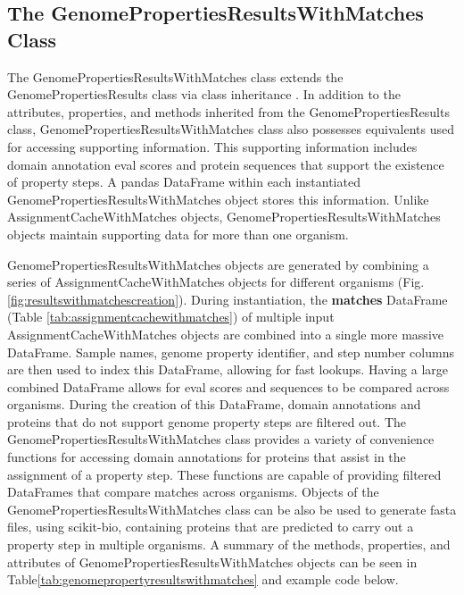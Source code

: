 \pagebreak

\subsection{The GenomePropertiesResultsWithMatches Class} 
\label{PropertyResultsWithMatches}

The GenomePropertiesResultsWithMatches class extends the GenomePropertiesResults 
class via class inheritance \cite{snyder1986encapsulation}. In addition to the 
attributes, properties, and methods inherited from the GenomePropertiesResults 
class, GenomePropertiesResultsWithMatches class also possesses equivalents used 
for accessing supporting information. This supporting information includes 
domain annotation \gls{eval} scores and protein sequences that support the 
existence of property steps. A pandas DataFrame within each instantiated 
GenomePropertiesResultsWithMatches object stores this information. Unlike 
AssignmentCacheWithMatches objects, GenomePropertiesResultsWithMatches objects 
maintain supporting data for more than one organism.

GenomePropertiesResultsWithMatches objects are generated by combining a series 
of AssignmentCacheWithMatches objects for different organisms (Fig. 
\ref{fig:resultswithmatchescreation}). During instantiation, the 
\textbf{matches} DataFrame (Table \ref{tab:assignmentcachewithmatches}) of 
multiple input AssignmentCacheWithMatches objects are combined into a single 
more massive DataFrame. Sample names, genome property identifier, and step 
number columns are then used to index this DataFrame, allowing for fast lookups. 
Having a large combined DataFrame allows for \gls{eval} scores and sequences to 
be compared across organisms. During the creation of this DataFrame, domain 
annotations and proteins that do not support genome property steps are filtered 
out. The GenomePropertiesResultsWithMatches class provides a variety of 
convenience functions for accessing domain annotations for proteins that assist 
in the assignment of a property step. These functions are capable of providing 
filtered DataFrames that compare matches across organisms. Objects of the 
GenomePropertiesResultsWithMatches class can be also be used to generate 
\gls{fasta} files, using \gls{scikit}-bio, containing proteins that are 
predicted to carry out a property step in multiple organisms. A summary of the 
methods, properties, and attributes of GenomePropertiesResultsWithMatches 
objects can be seen in Table\ref{tab:genomepropertyresultswithmatches} and 
example code below. 


